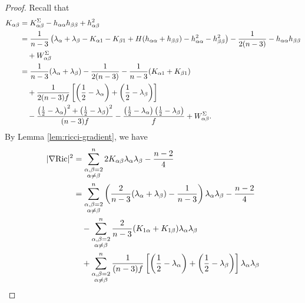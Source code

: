\documentclass[a4, 12pt]{amsart}
\theoremstyle{plain}
\begin{document}
\begin{proof}
	Recall that
\begin{equation*}
	\begin{aligned}
		K_{\alpha\beta} &= K^{\Sigma}_{\alpha\beta} - h_{\alpha\alpha}h_{\beta\beta} + h_{\alpha\beta}^2 \notag \\
		&= \frac{1}{n-3}\left(\lambda_{\alpha} + \lambda_{\beta} - K_{\alpha 1} - K_{\beta 1} + H(h_{\alpha\alpha} + h_{\beta\beta}) - h_{\alpha\alpha}^2 - h_{\beta\beta}^2\right) - \frac{1}{2(n-3)} - h_{\alpha\alpha}h_{\beta\beta} \notag \\
		&\quad + W^{\Sigma}_{\alpha\beta} \notag \\
		&= \frac{1}{n-3}(\lambda_{\alpha} + \lambda_{\beta}) - \frac{1}{2(n-3)} - \frac{1}{n-3}(K_{\alpha 1} + K_{\beta 1}) \notag \\
		&\quad + \frac{1}{2(n-3)f}\left[\left(\frac{1}{2} - \lambda_{\alpha}\right) + \left(\frac{1}{2} - \lambda_{\beta}\right)\right] \notag \\
		&\quad - \frac{\left(\frac{1}{2} - \lambda_{\alpha}\right)^2 + \left(\frac{1}{2} - \lambda_{\beta}\right)^2}{(n-3)f} - \frac{\left(\frac{1}{2} - \lambda_{\alpha}\right)\left(\frac{1}{2} - \lambda_{\beta}\right)}{f} + W^{\Sigma}_{\alpha\beta}. \label{eq:K-alpha-beta}
	\end{aligned}
\end{equation*}
	By Lemma \ref{lem:ricci-gradient}, we have
	\begin{equation*}
	\begin{aligned}
		|\nabla \mathrm{Ric}|^2 &= \sum_{\substack{\alpha,\beta=2 \\ \alpha\neq\beta}}^n 2K_{\alpha\beta}\lambda_{\alpha}\lambda_{\beta} - \frac{n-2}{4} \notag \\
		&= \sum_{\substack{\alpha,\beta=2 \\ \alpha\neq\beta}}^n \left(\frac{2}{n-3}(\lambda_{\alpha} + \lambda_{\beta}) - \frac{1}{n-3}\right)\lambda_{\alpha}\lambda_{\beta} - \frac{n-2}{4} \notag \\
		&\quad - \sum_{\substack{\alpha,\beta=2 \\ \alpha\neq\beta}}^n \frac{2}{n-3}(K_{1\alpha} + K_{1\beta})\lambda_\alpha\lambda_\beta \notag \\
		&\quad + \sum_{\substack{\alpha,\beta=2 \\ \alpha\neq\beta}}^n \frac{1}{(n-3)f}\left[\left(\frac{1}{2} - \lambda_{\alpha}\right) + \left(\frac{1}{2} - \lambda_{\beta}\right)\right]\lambda_\alpha\lambda_\beta \notag \\

\end{aligned}
\end{equation*}
\end{proof}
\end{document}
